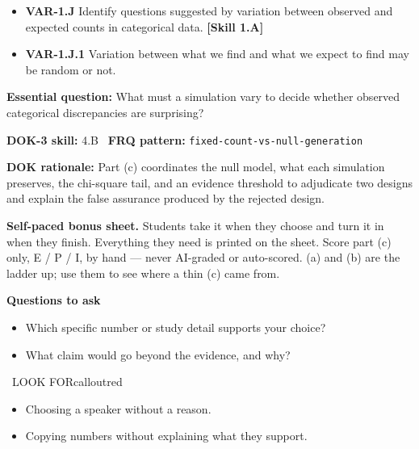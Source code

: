 \documentclass[11pt]{article}
\begin{document}


{\small
\begin{itemize}[leftmargin=1.5em,itemsep=2pt,topsep=2pt]
  \item \textbf{VAR-1.J} Identify questions suggested by variation between observed and expected counts in categorical data. \textbf{[Skill 1.A]}
  \item \textbf{VAR-1.J.1} Variation between what we find and what we expect to find may be random or not.
\end{itemize}
}
\textbf{Essential question:} What must a simulation vary to decide whether observed categorical discrepancies are surprising?\par
\textbf{DOK-3 skill:} 4.B \textperiodcentered\ \textbf{FRQ pattern:} {\small\texttt{fixed-\allowbreak{}count-\allowbreak{}vs-\allowbreak{}null-\allowbreak{}generation}}\par
\textbf{DOK rationale:} Part (c) coordinates the null model, what each simulation preserves, the chi-square tail, and an evidence threshold to adjudicate two designs and explain the false assurance produced by the rejected design.\par

\textbf{Self-paced bonus sheet.} Students take it when they choose and turn it in when they finish. Everything they need is printed on the sheet. Score part (c) only, E / P / I, by hand --- never AI-graded or auto-scored. (a) and (b) are the ladder up; use them to see where a thin (c) came from.\par

\textbf{Questions to ask}
\begin{itemize}[leftmargin=1.5em,itemsep=2pt,topsep=2pt]
  \item Which specific number or study detail supports your choice?
  \item What claim would go beyond the evidence, and why?
\end{itemize}

\begin{callout}{\IconWarn\ LOOK FOR}{calloutred}
\begin{itemize}[leftmargin=1.5em,itemsep=2pt,topsep=2pt]
  \item Choosing a speaker without a reason.
  \item Copying numbers without explaining what they support.
\end{itemize}
\end{callout}
\end{document}
